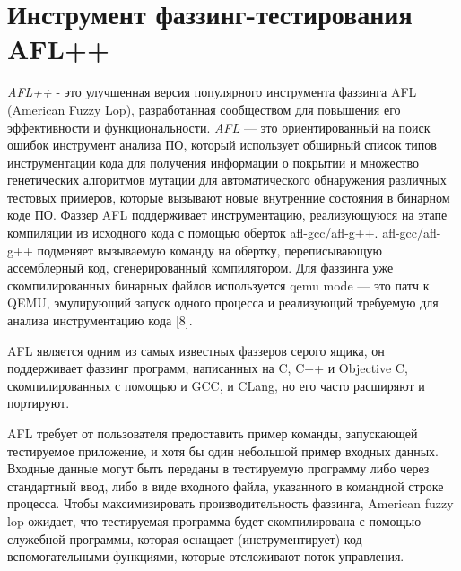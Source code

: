 \chapter{Инструмент фаззинг-тестирования AFL++} \label{ch3}


\textit{AFL++} - это улучшенная версия популярного инструмента фаззинга AFL (American Fuzzy Lop), разработанная сообществом для повышения его эффективности и функциональности. \textit{AFL} — это ориентированный на поиск ошибок инструмент анализа ПО, который использует обширный список типов инструментации кода для получения информации о покрытии и множество генетических алгоритмов мутации для автоматического обнаружения различных тестовых примеров, которые вызывают новые внутренние состояния в бинарном коде ПО. Фаззер AFL поддерживает инструментацию, реализующуюся на этапе компиляции из исходного кода с помощью оберток afl-gcc/afl-g++. afl-gcc/afl-g++ подменяет вызываемую команду на обертку, переписывающую ассемблерный код, сгенерированный компилятором. Для фаззинга уже скомпилированных бинарных файлов используется qemu mode — это патч к QEMU, эмулирующий запуск одного процесса и реализующий требуемую для анализа инструментацию кода [8].
\par
AFL является одним из самых известных фаззеров серого ящика, он поддерживает фаззинг программ, написанных на C, C++ и Objective C, скомпилированных с помощью и GCC, и CLang, но его часто расширяют и портируют.
\par
AFL требует от пользователя предоставить пример команды, запускающей тестируемое приложение, и хотя бы один небольшой пример входных данных. Входные данные могут быть переданы в тестируемую программу либо через стандартный ввод, либо в виде входного файла, указанного в командной строке процесса. Чтобы максимизировать производительность фаззинга, American fuzzy lop ожидает, что тестируемая программа будет скомпилирована с помощью служебной программы, которая оснащает (инструментирует) код вспомогательными функциями, которые отслеживают поток управления.

